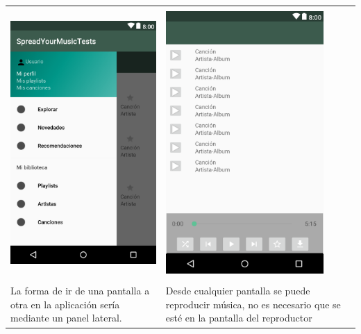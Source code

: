 \begin{tabular}{ p{6cm} p{6cm}}
\hline
\\
\includegraphics[width=6cm]{Figures/android/Home-NavigationDrawer.png}
&
\includegraphics[width=6cm]{Figures/android/lista-reproductor.png} \\
\hline
\\
La forma de ir de una pantalla a otra en la aplicación sería mediante un panel lateral.
&
Desde cualquier pantalla se puede reproducir música, no es necesario que se esté en la pantalla del reproductor \\
\hline
\end{tabular}

